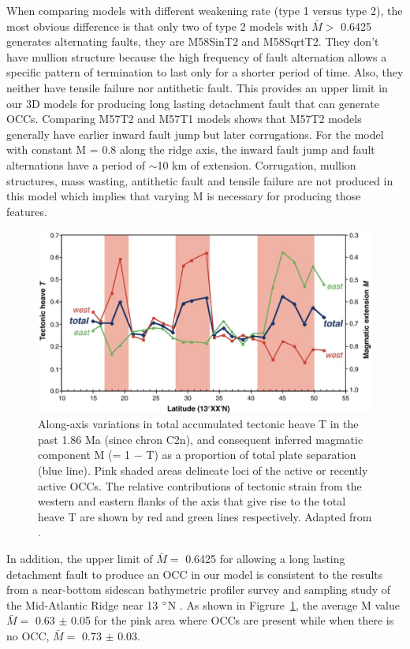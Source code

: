 When comparing models with different weakening rate (type 1 versus type 2), the most obvious difference is that only two of type 2 models with $\bar{M} >$ 0.6425 generates alternating faults, they are M58SinT2 and M58SqrtT2. They don't have mullion structure because the high frequency of fault alternation allows a specific pattern of termination to last only for a shorter period of time. Also, they neither have tensile failure nor antithetic fault. This provides an upper limit in our 3D models for producing long lasting detachment fault that can generate OCCs. Comparing M57T2 and M57T1 models shows that M57T2 models generally have earlier inward fault jump but later corrugations. For the model with constant M = 0.8 along the ridge axis, the inward fault jump and fault alternations have a period of $\sim$10 km of extension. Corrugation, mullion structures, mass wasting, antithetic fault and tensile failure are not produced in this model which implies that varying M is necessary for producing those features.

\begin{figure}[h]
 \centering
  \includegraphics[width=1\textwidth]{./Figures/fig_Discussion_ResultsSummary_MacLeod2009.eps}
 \caption{Along-axis variations in total accumulated tectonic heave T in the past 1.86 Ma (since chron C2n), and consequent inferred magmatic component M (= 1 $-$ T) as a proportion of total plate separation (blue line). Pink shaded areas delineate loci of the active or recently active OCCs. The relative contributions of tectonic strain from the western and eastern flanks of the axis that give rise to the total heave T are shown by red and green lines respectively. Adapted from \citep{MacLeod2009}. }
 \label{fig_Discussion_ResultsSummary_MacLeod2009}
\end{figure}

In addition, the upper limit of $\bar{M} = $ 0.6425 for allowing a long lasting detachment fault to produce an OCC in our model is consistent to the results from a near-bottom sidescan bathymetric profiler survey and sampling study of the Mid-Atlantic Ridge near 13 $\degree$N \citep{MacLeod2009}. As shown in Figrure~\hyperref[fig_Discussion_ResultsSummary_MacLeod2009]{\ref{fig_Discussion_ResultsSummary_MacLeod2009}}, the average M value $\bar{M} =$ 0.63 $\pm$ 0.05 for the pink area where OCCs are present while when there is no OCC, $\bar{M} =$ 0.73 $\pm$ 0.03.

